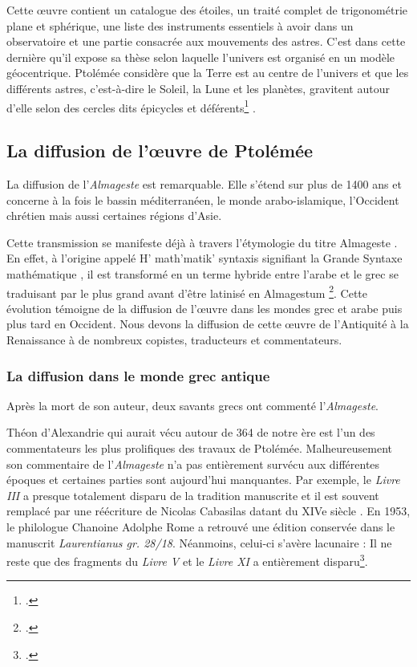 Cette œuvre contient un catalogue des étoiles, un traité complet de trigonométrie plane et sphérique, une liste des instruments essentiels à avoir dans un observatoire et une partie consacrée aux mouvements des astres. C'est dans cette dernière qu'il expose sa thèse selon laquelle l'univers est organisé en un modèle géocentrique.  Ptolémée considère que la Terre est au centre de l'univers et que les différents astres, c'est-à-dire le Soleil, la Lune et les planètes, gravitent autour d'elle selon des cercles dits épicycles et déférents\footcite{costabelCLAUDEPTOLEMEE90} . 

\subsection{La diffusion de l'œuvre de Ptolémée}
La diffusion de l'\textit{Almageste} est remarquable. Elle s'étend sur plus de 1400 ans et concerne à la fois le bassin méditerranéen, le monde arabo-islamique, l'Occident chrétien mais aussi certaines régions d'Asie. 

Cette transmission se manifeste déjà à travers l'étymologie du titre \og Almageste \fg. En effet, à l'origine appelé \og H' math'matik' syntaxis \fg signifiant la \og Grande Syntaxe mathématique \fg, il est transformé en un terme hybride entre l'arabe et le grec se traduisant par \og le plus grand \fg avant d'être latinisé en \og Almagestum \fg\footcite{raymondjonesPtolemyAccomplishmentsBiography2025}. Cette évolution témoigne de la diffusion de l'œuvre dans les mondes grec et arabe puis plus tard en Occident. Nous devons la diffusion de cette œuvre de l'Antiquité à la Renaissance à de nombreux copistes, traducteurs et commentateurs.  

\subsubsection{La diffusion dans le monde grec antique}
Après la mort de son auteur, deux savants grecs ont commenté l'\textit{Almageste}. 

Théon d'Alexandrie qui aurait vécu autour de 364 de notre ère est l'un des commentateurs les plus prolifiques des travaux de Ptolémée. Malheureusement  son commentaire de l'\textit{Almageste} n'a pas entièrement survécu aux différentes époques et certaines parties sont aujourd'hui manquantes. Par exemple, le \textit{Livre III} a presque totalement disparu de la tradition manuscrite et il est souvent remplacé par une réécriture de Nicolas Cabasilas datant du XIVe siècle . En 1953, le philologue Chanoine Adolphe Rome a retrouvé une édition conservée dans le manuscrit \textit{Laurentianus gr. 28/18}. Néanmoins, celui-ci s'avère lacunaire : Il ne reste que des fragments du \textit{Livre V} et le \textit{Livre XI} a entièrement disparu\footcite{tihonLivreRetrouveCommentaire1987}. 

